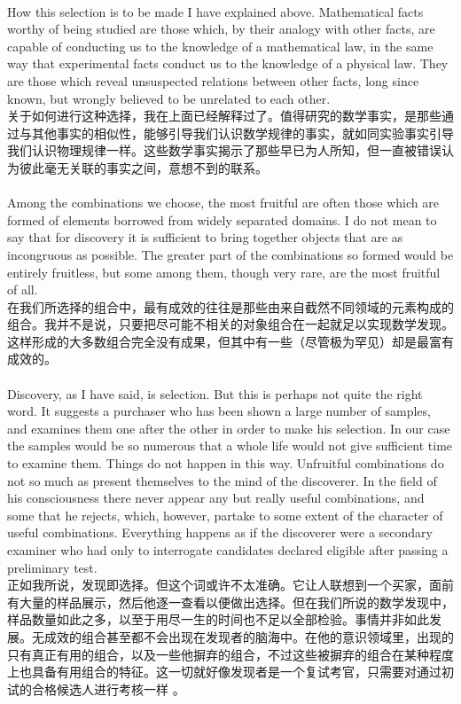 \documentclass{article}
\begin{document}
\\
How this selection is to be made I have explained above. Mathematical facts worthy of being studied are those which, by their analogy with other facts, are capable of conducting us to the knowledge of a mathematical law, in the same way that experimental facts conduct us to the knowledge of a physical law. They are those which reveal unsuspected relations between other facts, long since known, but wrongly believed to be unrelated to each other.\\
关于如何进行这种选择，我在上面已经解释过了。值得研究的数学事实，是那些通过与其他事实的相似性，能够引导我们认识数学规律的事实，就如同实验事实引导我们认识物理规律一样。这些数学事实揭示了那些早已为人所知，但一直被错误认为彼此毫无关联的事实之间，意想不到的联系。 \\ 

\\
Among the combinations we choose, the most fruitful are often those which are formed of elements borrowed from widely separated domains. I do not mean to say that for discovery it is sufficient to bring together objects that are as incongruous as possible. The greater part of the combinations so formed would be entirely fruitless, but some among them, though very rare, are the most fruitful of all.\\
在我们所选择的组合中，最有成效的往往是那些由来自截然不同领域的元素构成的组合。我并不是说，只要把尽可能不相关的对象组合在一起就足以实现数学发现。这样形成的大多数组合完全没有成果，但其中有一些（尽管极为罕见）却是最富有成效的。 \\ 

\\
Discovery, as I have said, is selection. But this is perhaps not quite the right word. It suggests a purchaser who has been shown a large number of samples, and examines them one after the other in order to make his selection. In our case the samples would be so numerous that a whole life would not give sufficient time to examine them. Things do not happen in this way. Unfruitful combinations do not so much as present themselves to the mind of the discoverer. In the field of his consciousness there never appear any but really useful combinations, and some that he rejects, which, however, partake to some extent of the character of useful combinations. Everything happens as if the discoverer were a secondary examiner who had only to interrogate candidates declared eligible after passing a preliminary test.\\
正如我所说，发现即选择。但这个词或许不太准确。它让人联想到一个买家，面前有大量的样品展示，然后他逐一查看以便做出选择。但在我们所说的数学发现中，样品数量如此之多，以至于用尽一生的时间也不足以全部检验。事情并非如此发展。无成效的组合甚至都不会出现在发现者的脑海中。在他的意识领域里，出现的只有真正有用的组合，以及一些他摒弃的组合，不过这些被摒弃的组合在某种程度上也具备有用组合的特征。这一切就好像发现者是一个复试考官，只需要对通过初试的合格候选人进行考核一样 。 \\
\end{document}
